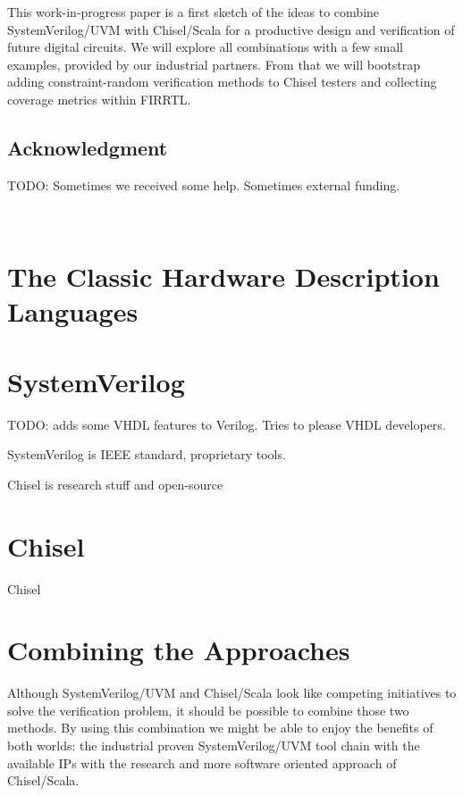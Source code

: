 \documentclass[a4paper, conference]{IEEEtran}
\newcommand{\todo}[1]{{\color{olive} TODO: #1}}
\begin{document}
This work-in-progress paper is a first sketch of the ideas to combine SystemVerilog/UVM
with Chisel/Scala for a productive design and verification of future digital circuits.
We will explore all combinations with a few small examples, provided by our industrial
partners.
From that we will bootstrap adding constraint-random verification methods to Chisel
testers and collecting coverage metrics within FIRRTL.

\subsection*{Acknowledgment}

\todo{Sometimes we received some help. Sometimes external funding.}


~
\newpage

\section{The Classic Hardware Description Languages}

\section{SystemVerilog}

\todo{adds some VHDL features to Verilog. Tries to please VHDL developers.}

SystemVerilog is IEEE standard, proprietary tools.

Chisel is research stuff and open-source

\section{Chisel}

Chisel~\cite{chisel:dac2012} 

\section{Combining the Approaches}

Although SystemVerilog/UVM and Chisel/Scala look like competing initiatives
to solve the verification problem, it should be possible to combine those two methods.
By using this combination we might be able to enjoy the benefits of both worlds:
the industrial proven SystemVerilog/UVM tool chain with the available IPs with
the research and more software oriented approach of Chisel/Scala. 
\end{document}
